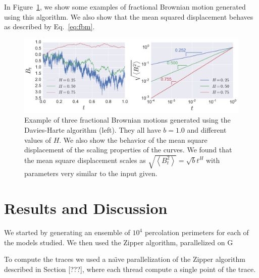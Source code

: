In Figure~\ref{fig:fbm}, we show some examples of fractional Brownian motion
generated using this algorithm. We also show that the mean squared displacement
behaves as described by Eq.~\ref{eq:fbm}.

\begin{figure}
\begin{center}
    \includegraphics[scale=0.45]{chapters/ch6-asle/figs/fbm}
\end{center}
\caption{Example of three fractional Brownian motions generated using the
    Davies-Harte algorithm (left). They all have $b=1.0$ and different values
    of $H$. We also show the behavior of the mean square displacement of the
    scaling properties of the curves. We found that the mean square displacement
    scales as $\sqrt{\left\langle B_t^2\right\rangle}=\sqrt{b}t^H$ with
    parameters very similar to the input given.}
\label{fig:fbm}
\end{figure}


\section{Results and Discussion}
\label{sec:scaling}

We started by generating an ensemble of $10^4$ percolation perimeters for each
of the models studied. We then used the Zipper algorithm, parallelized on
G

To compute the traces we used a na\"\i{}ve parallelization of the Zipper algorithm
described in Section [???], where each thread compute a single point of the trace.


